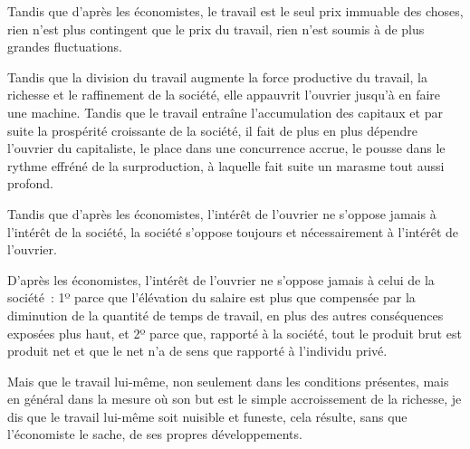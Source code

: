 \documentclass[french,twoside]{book} %
\newcommand{\astertri}{\medskip\par\centerline{\color{rubric}\large\selectfont{\syms ✻\,✻\,✻}}\medskip\par}%
\begin{document}
Tandis que d’après les économistes, le travail est le seul prix immuable des choses, rien n’est plus contingent que le prix du travail, rien n’est soumis à de plus grandes fluctuations.\par
Tandis que la division du travail augmente la force productive du travail, la richesse et le raffinement de la société, elle appauvrit l’ouvrier jusqu’à en faire une machine. Tandis que le travail entraîne l’accumulation des capitaux et par suite la prospérité croissante de la société, il fait de plus en plus dépendre l’ouvrier du capitaliste, le place dans une concurrence accrue, le pousse dans le rythme effréné de la surproduction, à laquelle fait suite un marasme tout aussi profond.\par
Tandis que d’après les économistes, l’intérêt de l’ouvrier ne s’oppose jamais à l’intérêt de la société, la société s’oppose toujours et nécessairement à l’intérêt de l’ouvrier.\par
D’après les économistes, l’intérêt de l’ouvrier ne s’oppose jamais à celui de la société : 1º parce que l’élévation du salaire est plus que compensée par la diminution de la quantité de temps de travail, en plus des autres conséquences exposées plus haut, et 2º parce que, rapporté à la société, tout le produit brut est produit net et que le net n’a de sens que rapporté à l’individu privé.\par
Mais que le travail lui-même, non seulement dans les conditions présentes, mais en général dans la mesure où son but est le simple accroissement de la richesse, je dis que le travail lui-même soit nuisible et funeste, cela résulte, sans que l’économiste le sache, de ses propres développements.\par

\astertri
\end{document}
